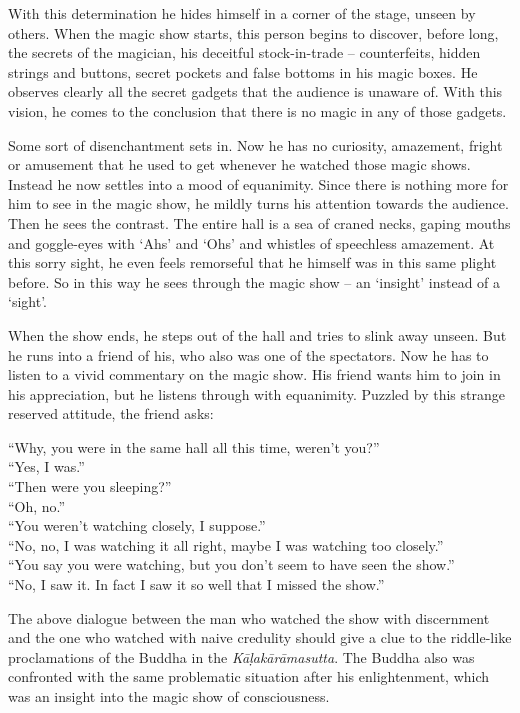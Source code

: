 With this determination he hides himself in a corner of the stage, unseen by others. When the magic show starts, this person begins to discover, before long, the secrets of the magician, his deceitful stock-in-trade -- counterfeits, hidden strings and buttons, secret pockets and false bottoms in his magic boxes. He observes clearly all the secret gadgets that the audience is unaware of. With this vision, he comes to the conclusion that there is no magic in any of those gadgets.

Some sort of disenchantment sets in. Now he has no curiosity, amazement, fright or amusement that he used to get whenever he watched those magic shows. Instead he now settles into a mood of equanimity. Since there is nothing more for him to see in the magic show, he mildly turns his attention towards the audience. Then he sees the contrast. The entire hall is a sea of craned necks, gaping mouths and goggle-eyes with `Ahs' and `Ohs' and whistles of speechless amazement. At this sorry sight, he even feels remorseful that he himself was in this same plight before. So in this way he sees through the magic show -- an `insight' instead of a `sight'.

When the show ends, he steps out of the hall and tries to slink away unseen. But he runs into a friend of his, who also was one of the spectators. Now he has to listen to a vivid commentary on the magic show. His friend wants him to join in his appreciation, but he listens through with equanimity. Puzzled by this strange reserved attitude, the friend asks:

\clearpage

``Why, you were in the same hall all this time, weren't you?''\\
``Yes, I was.''\\
``Then were you sleeping?''\\
``Oh, no.''\\
``You weren't watching closely, I suppose.''\\
``No, no, I was watching it all right, maybe I was watching too closely.''\\
``You say you were watching, but you don't seem to have seen the show.''\\
``No, I saw it. In fact I saw it so well that I missed the show.''

The above dialogue between the man who watched the show with discernment and the one who watched with naive credulity should give a clue to the riddle-like proclamations of the Buddha in the \emph{Kāḷakārāmasutta}. The Buddha also was confronted with the same problematic situation after his enlightenment, which was an insight into the magic show of consciousness.

